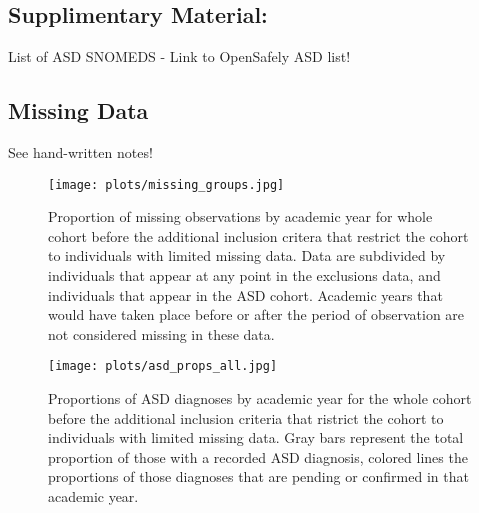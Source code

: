 \documentclass[
]{article}
\begin{document}
\hypertarget{supplimentary-material}{%
\subsection{Supplimentary Material:}\label{supplimentary-material}}

List of ASD SNOMEDS - Link to OpenSafely ASD list!

\hypertarget{missing-data}{%
\subsection{Missing Data}\label{missing-data}}

See hand-written notes!

\begin{figure}[H]
\centering
\texttt{[image: plots/missing\_groups.jpg]}
\caption{Proportion of missing observations by academic year for whole cohort before the additional inclusion critera that restrict the cohort to individuals with limited missing data. Data are subdivided by individuals that appear at any point in the exclusions data, and individuals that appear in the ASD cohort. Academic years that would have taken place before or after the period of observation are not considered missing in these data.}
\label{fig:missing_groups}
\end{figure}

\begin{figure}[H]
\centering
\texttt{[image: plots/asd\_props\_all.jpg]}
\caption{Proportions of ASD diagnoses by academic year for the whole cohort before the additional inclusion criteria that ristrict the cohort to individuals with limited missing data. Gray bars represent the total proportion of those with a recorded ASD diagnosis, colored lines the proportions of those diagnoses that are pending or confirmed in that academic year.}
\label{fig:asd_props_all}
\end{figure}
\end{document}
